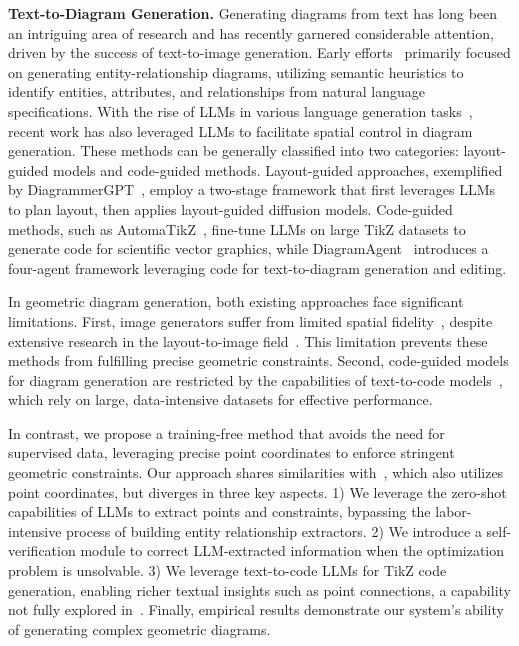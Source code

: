 \noindent 
\textbf{Text-to-Diagram Generation.}
Generating diagrams from text has long been an intriguing area of research and has recently garnered considerable attention, driven by the success of text-to-image generation. Early efforts~\cite{ghosh2018automated,shahbaz2011automatic, btoush2015generating} primarily focused on generating entity-relationship diagrams, utilizing semantic heuristics to identify entities, attributes, and relationships from natural language specifications. With the rise of LLMs in various language generation tasks~\cite{touvron2023llama, touvron2023llama1, openai2024gpt,chung2024scaling, mann2020language, chowdhery2023palm}, recent work has also leveraged LLMs to facilitate spatial control in diagram generation. 
These methods can be generally classified into two categories: layout-guided models and code-guided methods. Layout-guided approaches, exemplified by DiagrammerGPT~\cite{zala2023diagrammergpt}, employ a two-stage framework that first leverages LLMs to plan layout, then applies layout-guided diffusion models.
Code-guided methods, such as AutomaTikZ~\cite{belouadi2023automatikz}, fine-tune LLMs on large TikZ datasets to generate code for scientific vector graphics, while DiagramAgent~\cite{wei2024words} introduces a four-agent framework leveraging code for text-to-diagram generation and editing.

In geometric diagram generation, both existing approaches face significant limitations. First, image generators suffer from limited spatial fidelity~\cite{gokhale2022benchmarking, chatterjee2024revision, chatterjee2024getting}, despite extensive research in the layout-to-image field~\cite{li2023gligen, yang2023reco,balaji2022ediff, singh2023high, couairon2023zero, xie2023boxdiff}. This limitation prevents these methods from fulfilling precise geometric constraints.
Second, code-guided models for diagram generation are restricted by the capabilities of text-to-code models~\cite{roziere2023code,fried2022incoder,li2022competition,hui2024qwen2,guo2024deepseek}, which rely on large, data-intensive datasets for effective performance.

In contrast, we propose a training-free method that avoids the need for supervised data, leveraging precise point coordinates to enforce stringent geometric constraints. Our approach shares similarities with~\citet{zhengyu2023precise}, which also utilizes point coordinates, but diverges in three key aspects. 1) We leverage the zero-shot capabilities of LLMs to extract points and constraints, bypassing the labor-intensive process of building entity relationship extractors. 2) We introduce a self-verification module to correct LLM-extracted information when the optimization problem is unsolvable. 3) We leverage text-to-code LLMs for TikZ code generation, enabling richer textual insights such as point connections, a capability not fully explored in~\citet{zhengyu2023precise}. Finally, empirical results demonstrate our system's ability of generating complex geometric diagrams.








